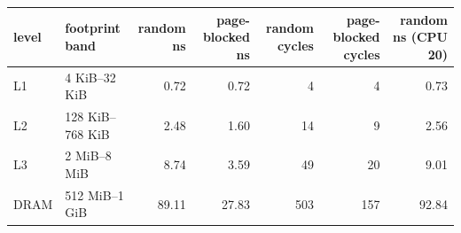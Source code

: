 \begin{tabular}{llrrrrr}
\toprule
level & footprint band & random ns & page-blocked ns & random cycles & page-blocked cycles & random ns (CPU 20) \\
\midrule
L1 & 4 KiB--32 KiB & 0.72 & 0.72 & 4 & 4 & 0.73 \\
L2 & 128 KiB--768 KiB & 2.48 & 1.60 & 14 & 9 & 2.56 \\
L3 & 2 MiB--8 MiB & 8.74 & 3.59 & 49 & 20 & 9.01 \\
DRAM & 512 MiB--1 GiB & 89.11 & 27.83 & 503 & 157 & 92.84 \\
\bottomrule
\end{tabular}
